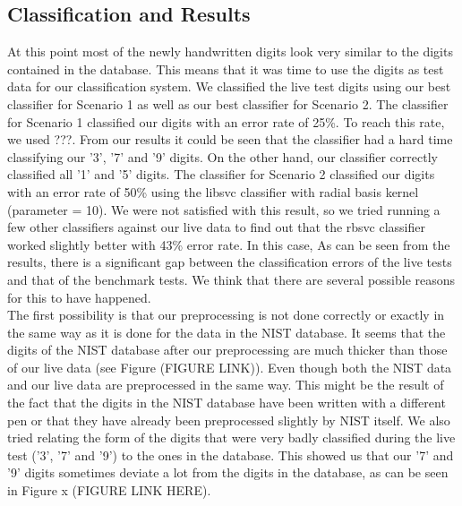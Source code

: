 \documentclass[11pt,twoside,a4paper]{article}
\begin{document}
\subsection{Classification and Results}
At this point most of the newly handwritten digits look very similar to the digits contained in the database. This means that it was time to use the digits as test data for our classification system. We classified the live test digits using our best classifier for Scenario 1 as well as our best classifier for Scenario 2. 
\newline
\newline
The classifier for Scenario 1 classified our digits with an error rate of 25\%. To reach this rate, we used ???. From our results it could be seen that the classifier had a hard time classifying our '3', '7' and '9' digits. On the other hand, our classifier correctly classified all '1' and '5' digits.\newline
\newline
The classifier for Scenario 2 classified our digits with an error rate of 50\% using the libsvc classifier with radial basis kernel (parameter = 10). We were not satisfied with this result, so we tried running a few other classifiers against our live data to find out that the rbsvc classifier worked slightly better with 43\% error rate. In this case,  \newline
\newline
As can be seen from the results, there is a significant gap between the classification errors of the live tests and that of the benchmark tests. We think that there are several possible reasons for this to have happened.\\
The first possibility is that our preprocessing is not done correctly or exactly in the same way as it is done for the data in the NIST database. It seems that the digits of the NIST database after our preprocessing are much thicker than those of our live data (see Figure (FIGURE LINK)). Even though both the NIST data and our live data are preprocessed in the same way. This might be the result of the fact that the digits in the NIST database have been written with a different pen or that they have already been preprocessed slightly by NIST itself.\newline
We also tried relating the form of the digits that were very badly classified during the live test ('3', '7' and '9') to the ones in the database. This showed us that our '7' and '9' digits sometimes deviate a lot from the digits in the database, as can be seen in Figure x (FIGURE LINK HERE).\newline\newline
\newline\newline
\end{document}
